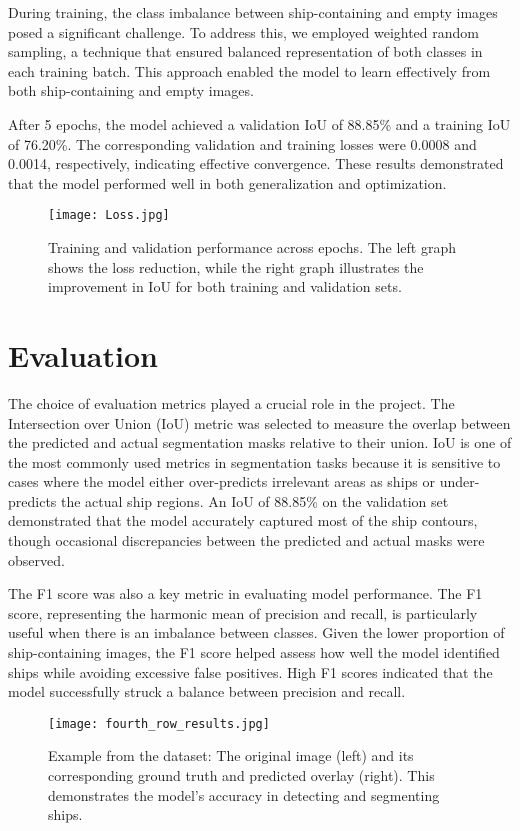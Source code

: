 \documentclass{article}
\begin{document}
During training, the class imbalance between ship-containing and empty images posed a significant challenge. To address this, we employed weighted random sampling, a technique that ensured balanced representation of both classes in each training batch. This approach enabled the model to learn effectively from both ship-containing and empty images.

After 5 epochs, the model achieved a validation IoU of 88.85\% and a training IoU of 76.20\%. The corresponding validation and training losses were 0.0008 and 0.0014, respectively, indicating effective convergence. These results demonstrated that the model performed well in both generalization and optimization.

\begin{figure}[h]
    \centering
    \texttt{[image: Loss.jpg]}
    \caption{Training and validation performance across epochs. The left graph shows the loss reduction, while the right graph illustrates the improvement in IoU for both training and validation sets.}
    \label{fig:loss_and_iou}
\end{figure}


\section{Evaluation}

The choice of evaluation metrics played a crucial role in the project. The Intersection over Union (IoU) metric was selected to measure the overlap between the predicted and actual segmentation masks relative to their union. IoU is one of the most commonly used metrics in segmentation tasks because it is sensitive to cases where the model either over-predicts irrelevant areas as ships or under-predicts the actual ship regions. An IoU of 88.85\% on the validation set demonstrated that the model accurately captured most of the ship contours, though occasional discrepancies between the predicted and actual masks were observed.

The F1 score was also a key metric in evaluating model performance. The F1 score, representing the harmonic mean of precision and recall, is particularly useful when there is an imbalance between classes. Given the lower proportion of ship-containing images, the F1 score helped assess how well the model identified ships while avoiding excessive false positives. High F1 scores indicated that the model successfully struck a balance between precision and recall.

\begin{figure}[h]
    \centering
    \texttt{[image: fourth\_row\_results.jpg]}
    \caption{Example from the dataset: The original image (left) and its corresponding ground truth and predicted overlay (right). This demonstrates the model's accuracy in detecting and segmenting ships.}
    \label{fig:fourth_row_example}
\end{figure}
\end{document}
